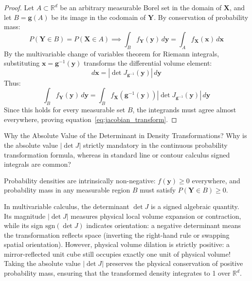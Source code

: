\begin{proof}
Let $A \subset \mathbb{R}^d$ be an arbitrary measurable Borel set in the domain of $\mathbf{X}$, and let $B = \mathbf{g}(A)$ be its image in the codomain of $\mathbf{Y}$.
By conservation of probability mass:
\begin{equation}
P(\mathbf{Y} \in B) = P(\mathbf{X} \in A) \implies \int_B f_{\mathbf{Y}}(\mathbf{y}) \, d\mathbf{y} = \int_A f_{\mathbf{X}}(\mathbf{x}) \, d\mathbf{x}
\end{equation}
By the multivariable change of variables theorem for Riemann integrals, substituting $\mathbf{x} = \mathbf{g}^{-1}(\mathbf{y})$ transforms the differential volume element:
\begin{equation}
d\mathbf{x} = \left| \det J_{\mathbf{g}^{-1}}(\mathbf{y}) \right| \, d\mathbf{y}
\end{equation}
Thus:
\begin{equation}
\int_B f_{\mathbf{Y}}(\mathbf{y}) \, d\mathbf{y} = \int_B f_{\mathbf{X}}(\mathbf{g}^{-1}(\mathbf{y})) \left| \det J_{\mathbf{g}^{-1}}(\mathbf{y}) \right| \, d\mathbf{y}
\end{equation}
Since this holds for every measurable set $B$, the integrands must agree almost everywhere, proving equation~\eqref{eq:jacobian_transform}.
\end{proof}

\begin{ponderbox}{Why the Absolute Value of the Determinant in Density Transformations?}
Why is the absolute value $|\det J|$ strictly mandatory in the continuous probability transformation formula, whereas in standard line or contour calculus signed integrals are common?

\tcblower
Probability densities are intrinsically non-negative: $f(\mathbf{y}) \ge 0$ everywhere, and probability mass in any measurable region $B$ must satisfy $P(\mathbf{Y} \in B) \ge 0$. 

In multivariable calculus, the determinant $\det J$ is a signed algebraic quantity. Its magnitude $|\det J|$ measures physical local volume expansion or contraction, while its sign $\text{sgn}(\det J)$ indicates orientation: a negative determinant means the transformation reflects space (inverting the right-hand rule or swapping spatial orientation). However, physical volume dilation is strictly positive: a mirror-reflected unit cube still occupies exactly one unit of physical volume! Taking the absolute value $|\det J|$ preserves the physical conservation of positive probability mass, ensuring that the transformed density integrates to 1 over $\mathbb{R}^d$.
\end{ponderbox}

